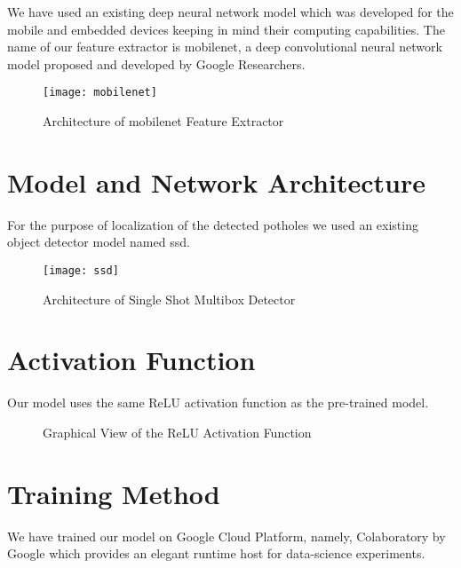         We have used an existing deep neural network model which was developed for the mobile and embedded devices keeping in mind their computing capabilities. The name of our feature extractor is \gls{mobilenet}, a deep convolutional neural network model proposed and developed by Google Researchers.
        
        \begin{figure}[h]
            \centering
            \texttt{[image: mobilenet]}
            \caption{Architecture of \gls{mobilenet} Feature Extractor}
            \label{fig:mobilenet_arch}
        \end{figure}
        
    \section{Model and Network Architecture}
        For the purpose of localization of the detected potholes we used an existing object detector model named \acrfull{ssd}.
                
        \begin{figure}[h]
            \centering
            \texttt{[image: ssd]}
            \caption{Architecture of Single Shot Multibox Detector}
            \label{fig:ssd_arch}
        \end{figure}
        
    \section{Activation Function}
        Our model uses the same ReLU activation function as the pre-trained model.
        \begin{figure}[h]
            \centering
            \caption{Graphical View of the ReLU Activation Function}
            \label{fig:relu}
        \end{figure}
            
            
    \section{Training Method}
        We have trained our model on Google Cloud Platform, namely, Colaboratory by Google which provides an elegant runtime host for data-science experiments.  
            
